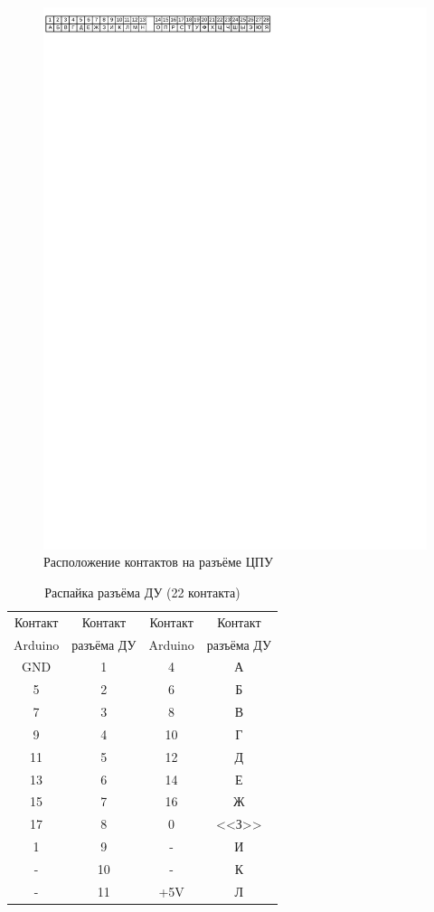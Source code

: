 \documentclass[10pt, a4paper, twocolumn]{article}
\begin{document}
\begin{figure}
\begin{center}
\includegraphics[width=\textwidth, clip, viewport=0 800 360 830]{cpu-jack}
\end{center}
\caption{Расположение контактов на разъёме ЦПУ}
\label{pic-cpu-jack}
\end{figure}

\begin{table}
\begin{center}
\caption{Распайка разъёма ДУ (22 контакта)}
\begin{tabular}{cccc}
\hline \hline
Контакт & Контакт & Контакт & Контакт \\
Arduino & разъёма ДУ & Arduino & разъёма ДУ \\
\hline
GND & 1 & 4 & А \\
5 & 2 & 6 & Б \\
7 & 3 & 8 & В \\
9 & 4 & 10 & Г \\
11 & 5 & 12 & Д \\
13 & 6 & 14 & Е \\
15 & 7 & 16 & Ж \\
17 & 8 & 0 & <<З>> \\
1 & 9 & - & И \\
- & 10 & - & К \\
- & 11 & +5V & Л \\
\hline \hline
\end{tabular}
\label{tab_rc_wires}
\end{center}
\end{table}
\end{document}
